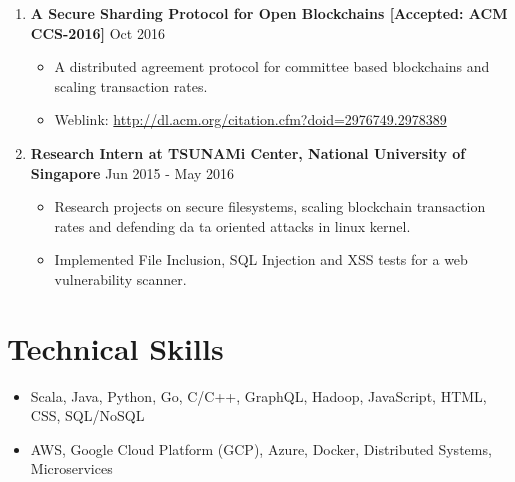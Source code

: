 \documentclass{article}
\newcommand{\bi}{\vspace{-1mm}\begin{itemize}[align=left,leftmargin=*, rightmargin=80pt, labelindent=0pt,labelsep=2pt, label={-}, nosep]}
\newcommand{\ei}{\end{itemize}}
\begin{document}
\begin{enumerate}
    \item \textbf{A Secure Sharding Protocol for Open Blockchains [Accepted: ACM CCS-2016]} {\hfill Oct 2016}
    \bi

        \item A distributed agreement protocol for committee based blockchains and scaling transaction rates.

        \item Weblink: \href{http://dl.acm.org/citation.cfm?doid=2976749.2978389}{http://dl.acm.org/citation.cfm?doid=2976749.2978389}
    \ei

    \item \textbf{Research Intern at TSUNAMi Center, National University of Singapore} {\hfill Jun 2015 - May 2016}
    \bi
        \item Research projects on secure filesystems, scaling blockchain transaction rates and defending da
ta oriented attacks in linux kernel.

        \item Implemented File Inclusion, SQL Injection and XSS tests for a web vulnerability scanner.
    \ei

\end{enumerate}

\vspace{-2mm}
\section*{Technical Skills}
\begin{itemize}
    \item Scala, Java, Python, Go, C/C++, GraphQL, Hadoop, JavaScript, HTML, CSS, SQL/NoSQL
    \item AWS, Google Cloud Platform (GCP), Azure, Docker, Distributed Systems, Microservices
\end{itemize}
\end{document}

